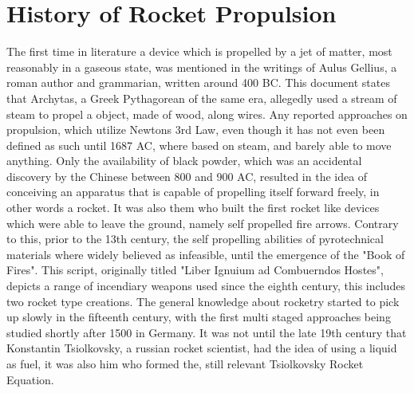 \section{History of Rocket Propulsion}
\author{Sebastian Schaffler}

The first time in literature a device which is propelled by a jet of matter, most reasonably in a gaseous state, was mentioned in the writings of Aulus Gellius, a roman author and grammarian, written around 400 BC. This document states that Archytas, a Greek Pythagorean of the same era, allegedly used a stream of steam to propel a object, made of wood, along wires. Any reported approaches on propulsion, which utilize Newtons 3rd Law, even though it has not even been defined as such until 1687 AC, where based on steam, and barely able to move anything. Only the availability of black powder, which was an accidental discovery by the Chinese between 800 and 900 AC, resulted in the idea of conceiving an apparatus that is capable of propelling itself forward freely, in other words a rocket. It was also them who built the first rocket like devices which were able to leave the ground, namely self propelled fire arrows. Contrary to this, prior to the 13th century, the self propelling abilities of pyrotechnical materials where widely believed as infeasible, until the emergence of the "Book of Fires". This script, originally titled "Liber Ignuium ad Combuerndos Hostes", depicts a range of incendiary weapons used since the eighth century, this includes two rocket type creations. The general knowledge about rocketry started to pick up slowly in the fifteenth century, with the first multi staged approaches being studied shortly after 1500 in Germany. It was not until the late 19th century that Konstantin Tsiolkovsky, a russian rocket scientist, had the idea of using a liquid as fuel, it was also him who formed the, still relevant Tsiolkovsky Rocket Equation.